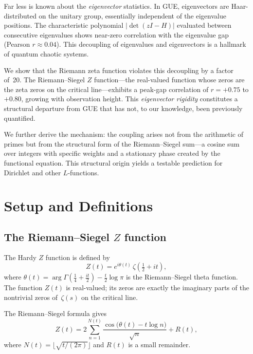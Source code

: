 \documentclass[11pt,a4paper]{article}
\begin{document}
Far less is known about the \emph{eigenvector} statistics.
In GUE, eigenvectors are Haar-distributed on the unitary group, essentially independent of the eigenvalue positions.
The characteristic polynomial $|\det(zI - H)|$ evaluated between consecutive eigenvalues shows near-zero correlation with the eigenvalue gap (Pearson $r \approx 0.04$).
This decoupling of eigenvalues and eigenvectors is a hallmark of quantum chaotic systems.

We show that the Riemann zeta function violates this decoupling by a factor of~20.
The Riemann--Siegel $Z$ function---the real-valued function whose zeros are the zeta zeros on the critical line---exhibits a peak-gap correlation of $r = +0.75$ to $+0.80$, growing with observation height.
This \emph{eigenvector rigidity} constitutes a structural departure from GUE that has not, to our knowledge, been previously quantified.

We further derive the mechanism: the coupling arises not from the arithmetic of primes but from the structural form of the Riemann--Siegel sum---a cosine sum over integers with specific weights and a stationary phase created by the functional equation.
This structural origin yields a testable prediction for Dirichlet and other $L$-functions.

\section{Setup and Definitions}

\subsection{The Riemann--Siegel $Z$ function}

The Hardy $Z$ function is defined by
\begin{equation}\label{eq:Z}
Z(t) = e^{i\theta(t)}\,\zeta\!\left(\tfrac{1}{2} + it\right),
\end{equation}
where $\theta(t) = \arg\Gamma\!\left(\tfrac{1}{4} + \tfrac{it}{2}\right) - \tfrac{t}{2}\log\pi$ is the Riemann--Siegel theta function.
The function $Z(t)$ is real-valued; its zeros are exactly the imaginary parts of the nontrivial zeros of~$\zeta(s)$ on the critical line.

The Riemann--Siegel formula gives
\begin{equation}\label{eq:RS}
Z(t) = 2\sum_{n=1}^{N(t)} \frac{\cos\bigl(\theta(t) - t\log n\bigr)}{\sqrt{n}} + R(t),
\end{equation}
where $N(t) = \lfloor\sqrt{t/(2\pi)}\rfloor$ and $R(t)$ is a small remainder.
\end{document}
